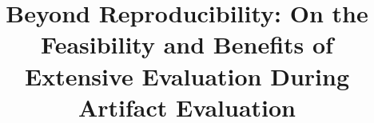 \usepackage[english]{babel}
\usepackage{amsthm}

\theoremstyle{definition}
\newtheorem{definition}{Definition}[section]


\newcommand{\yang}[1]{{\color{red}{Yang: #1}}}

\newcommand{\cblue}{\textcolor{blue}}
\newcommand{\cred}{\textcolor{red}}
\newcommand{\todo}{\textcolor{red}}




\date{}

\title{\Large \bf Beyond Reproducibility: On the Feasibility and Benefits of Extensive Evaluation During Artifact Evaluation}


\maketitle

